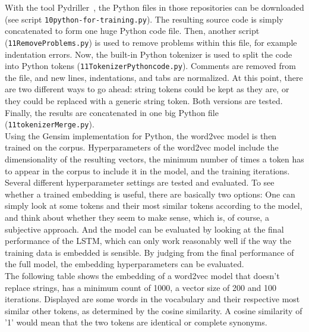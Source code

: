 \documentclass[
	a4paper,
	pagesize,
	pdftex,
	12pt,
	twoside, %
	BCOR=5mm, %
	ngerman,
	fleqn,
	final,
	]{scrartcl}
\begin{document}
\normalsize
With the tool Pydriller~\cite{Spadini.2018}, the Python files in those repositories can be downloaded (see script \texttt{10python-for-training.py}). The resulting source code is simply concatenated to form one huge Python code file. Then, another script (\texttt{11RemoveProblems.py}) is used to remove problems within this file, for example indentation errors. Now, the built-in Python tokenizer is used to split the code into Python tokens (\texttt{11TokenizerPythoncode.py}). Comments are removed from the file, and new lines, indentations, and tabs are normalized. At this point, there are two different ways to go ahead: string tokens could be kept as they are, or they could be replaced with a generic string token. Both versions are tested. Finally, the results are concatenated in one big Python file (\texttt{11tokenizerMerge.py}).\\
Using the Gensim implementation for Python, the word2vec model is then trained on the corpus. Hyperparameters of the word2vec model include the dimensionality of the resulting vectors, the minimum number of times a token has to appear in the corpus to include it in the model, and the training iterations. Several different hyperparameter settings are tested and evaluated. To see whether a trained embedding is useful, there are basically two options: One can simply look at some tokens and their most similar tokens according to the model, and think about whether they seem to make sense, which is, of course, a subjective approach. And the model can be evaluated by looking at the final performance of the LSTM, which can only work reasonably well if the way the training data is embedded is sensible. By judging from the final performance of the full model, the embedding hyperparameters can be evaluated.\\
The following table shows the embedding of a word2vec model that doesn't replace strings, has a minimum count of 1000, a vector size of 200 and 100 iterations. Displayed are some words in the vocabulary and their respective most similar other tokens, as determined by the cosine similarity. A cosine similarity of '1' would mean that the two tokens are identical or complete synonyms.
\end{document}
